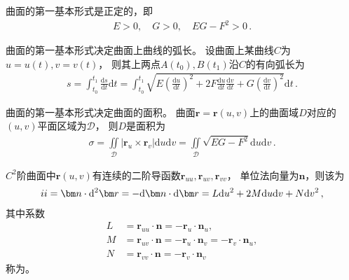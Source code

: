 \begin{corollary}
    曲面的第一基本形式是正定的，即
    \begin{align}\label{eq:03ex01.20}
        E>0,\quad G>0,\quad EG-F^2>0\, .
    \end{align}
\end{corollary}

\begin{corollary}
    曲面的第一基本形式决定曲面上曲线的弧长。
    设曲面上某曲线$C$为$u=u(t),v=v(t)$，
    则其上两点$A(t_0),B(t_1)$沿$C$的有向弧长为
    \begin{align}\label{eq:03ex01.21}
        s=\int_{t_0}^{t_1}{\frac{\mathrm{d}s}{\mathrm{d}t}\mathrm{d}t}=\int_{t_0}^{t_1}
        {\sqrt{E\left(\frac{\mathrm{d}u}{\mathrm{d}t}\right)^2+
            2F\frac{\mathrm{d}u}{\mathrm{d}t}\frac{\mathrm{d}v}{\mathrm{d}t}+
            G\left(\frac{\mathrm{d}v}{\mathrm{d}t}\right)^2}
        \mathrm{d}t}\, .
    \end{align}
\end{corollary}

\begin{corollary}
    曲面的第一基本形式决定曲面的面积。
    曲面$\bm r=\bm r(u,v)$上的曲面域$D$对应的$(u,v)$平面区域为$\mathscr{D}$，
    则$D$是面积为
    \begin{align}\label{eq:03ex01.22}
        \sigma=\iint\limits_{\mathscr{D}}{|\bm r_u\times\bm r_v|\mathrm{d}u\mathrm{d}v}=\iint\limits_{\mathscr{D}}{\sqrt{EG-F^2}\mathrm{d}u\mathrm{d}v}\, .
    \end{align}
\end{corollary}

\begin{definition}
    $C^2$阶曲面中$\bm r(u,v)$有连续的二阶导函数$\bm r_{uu},\bm r_{uv},\bm r_{vv}$，
    单位法向量为$\bm n$，则该为
    \begin{align}\label{eq:03ex01.23}
        \uppercase\expandafter{\romannumeral2}=\bm n\cdot\mathrm{d}^2\bm r=-\mathrm{d}\bm n\cdot\mathrm{d}\bm r=L\mathrm{d}u^2+2M\mathrm{d}u\mathrm{d}v+N\mathrm{d}v^2\, ,
    \end{align}
    其中系数
    \begin{align}\label{eq:03ex01.24}
        L & =\bm r_{uu}\cdot\bm n=-\bm r_u\cdot\bm n_u,                      \\
        M & =\bm r_{uv}\cdot\bm n=-\bm r_u\cdot\bm n_v=-\bm r_v\cdot\bm n_u, \\
        N & =\bm r_{vv}\cdot\bm n=-\bm r_v\cdot\bm n_v\,
    \end{align}
    称为。
\end{definition}

